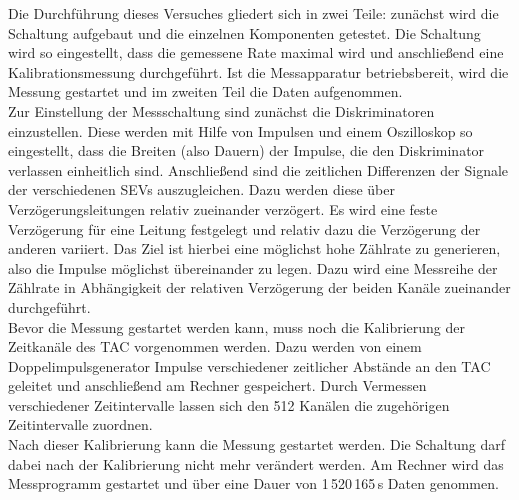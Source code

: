 Die Durchführung dieses Versuches gliedert sich in zwei Teile: zunächst wird die
Schaltung aufgebaut und die einzelnen Komponenten getestet. Die Schaltung wird
so eingestellt, dass die gemessene Rate maximal wird und anschließend eine
Kalibrationsmessung durchgeführt. Ist die Messapparatur betriebsbereit, wird die
Messung gestartet und im zweiten Teil die Daten aufgenommen. \\ Zur Einstellung
der Messschaltung sind zunächst die Diskriminatoren einzustellen. Diese werden
mit Hilfe von Impulsen und einem Oszilloskop so eingestellt, dass die Breiten
(also Dauern) der Impulse, die den Diskriminator verlassen einheitlich sind.
Anschließend sind die zeitlichen Differenzen der Signale der verschiedenen SEVs
auszugleichen. Dazu werden diese über Verzögerungsleitungen relativ zueinander
verzögert. Es wird eine feste Verzögerung für eine Leitung festgelegt und
relativ dazu die Verzögerung der anderen variiert. Das Ziel ist hierbei eine
möglichst hohe Zählrate zu generieren, also die Impulse möglichst übereinander
zu legen. Dazu wird eine Messreihe der Zählrate in Abhängigkeit der relativen
Verzögerung der beiden Kanäle zueinander durchgeführt. \\
Bevor die Messung gestartet werden kann, muss noch die Kalibrierung der
Zeitkanäle des TAC vorgenommen werden. Dazu werden von einem
Doppelimpulsgenerator Impulse verschiedener zeitlicher Abstände an den TAC
geleitet und anschließend am Rechner gespeichert. Durch Vermessen verschiedener
Zeitintervalle lassen sich den 512 Kanälen die zugehörigen Zeitintervalle
zuordnen. \\ Nach dieser Kalibrierung kann die Messung gestartet werden. Die
Schaltung darf dabei nach der Kalibrierung nicht mehr verändert werden. Am
Rechner wird das Messprogramm gestartet und über eine Dauer von 1\,520\,165\,s
Daten genommen.
